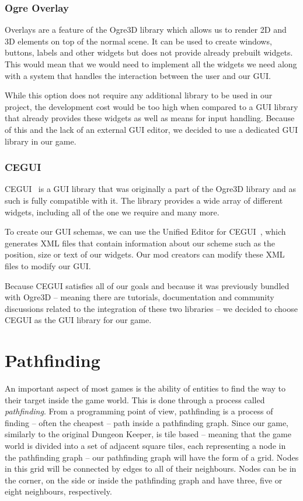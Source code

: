 \subsubsection{Ogre Overlay}

Overlays are a feature of the Ogre3D library which allows us to render 2D and 3D elements on top of the normal scene. It can be used to
create windows, buttons, labels and other widgets but does not provide already prebuilt widgets. This would mean that we would need
to implement all the widgets we need along with a system that handles the interaction between the user and our GUI.

While this option does not require any additional library to be used in our project, the development cost would be too high
when compared to a GUI library that already provides these widgets as well as means for input handling. Because of this and the lack of
an external GUI editor, we decided to use a dedicated GUI library in our game.

\subsubsection{CEGUI}

CEGUI~\cite{CEGUI} is a GUI library that was originally a part of the Ogre3D library and as such is fully compatible with it. The library
provides a wide array of different widgets, including all of the one we require and many more.

To create our GUI schemas, we can use the Unified Editor for CEGUI~\cite{CEED}, which generates XML files that contain information
about our scheme such as the position, size or text of our widgets. Our mod creators can modify these XML files to modify our GUI.

Because CEGUI satisfies all of our goals and because it was previously bundled with Ogre3D -- meaning there are tutorials, documentation
and community discussions related to the integration of these two libraries -- we decided to choose CEGUI as the GUI library for our game.

\section{Pathfinding}

An important aspect of most games is the ability of entities to find the way to their target inside the game world. This is done through
a process called \emph{pathfinding}. From a programming point of view, pathfinding is a process of finding -- often the cheapest -- path
inside a pathfinding graph. Since our game, similarly to the original Dungeon Keeper, is tile based -- meaning that the game world
is divided into a set of adjacent square tiles, each representing a node in the pathfinding graph -- our pathfinding graph will have the
form of a grid. Nodes in this grid will be connected by edges to all of their neighbours. Nodes can be in the corner, on the side
or inside the pathfinding graph and have three, five or eight neighbours, respectively.

